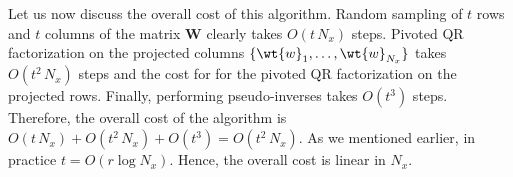 Let us now discuss the overall cost of this algorithm. Random sampling
of $t$ rows and $t$ columns of the matrix $\mathbf{W}$ clearly takes $O(t\,N_x)$
steps. Pivoted QR factorization on the projected columns
$\{\wt{w}_1,\ldots,\wt{w}_{N_x}\}$ takes $O(t^2\,N_x)$ steps and the cost for
for the pivoted QR factorization on the projected rows. Finally,
performing pseudo-inverses takes $O(t^3)$ steps. Therefore, the
overall cost of the algorithm is $O(t\,N_x) + O(t^2\,N_x) + O(t^3) = O(t^2\,N_x)$.
As we mentioned earlier, in practice $t=O(r \log N_x)$. Hence, the
overall cost is linear in $N_x$.



